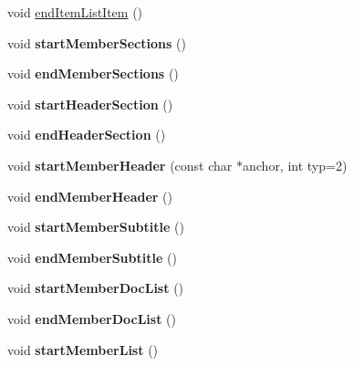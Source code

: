 \begin{DoxyCompactItemize}
\item 
void \mbox{\hyperlink{class_output_list_a784d921c1961db570e1b12905fe97c05}{end\+Item\+List\+Item}} ()
\item 
\mbox{\label{class_output_list_a6f8bf0192c18e0ea785c412b23f6fd3f}} 
void {\bfseries start\+Member\+Sections} ()
\item 
\mbox{\label{class_output_list_aff8a0fa5afe518609c8e95ae05a57ee6}} 
void {\bfseries end\+Member\+Sections} ()
\item 
\mbox{\label{class_output_list_a545dcbbbcdf8aac24e32df2abe0ea22d}} 
void {\bfseries start\+Header\+Section} ()
\item 
\mbox{\label{class_output_list_a327fd876b42a81d55c668042dc3104d7}} 
void {\bfseries end\+Header\+Section} ()
\item 
\mbox{\label{class_output_list_a9f5502582b1bf4ccf75108be20d78545}} 
void {\bfseries start\+Member\+Header} (const char $\ast$anchor, int typ=2)
\item 
\mbox{\label{class_output_list_ad50904387e56ccb6532385bfe525e9a2}} 
void {\bfseries end\+Member\+Header} ()
\item 
\mbox{\label{class_output_list_add8c37a5cb21fb366c941cea862b2285}} 
void {\bfseries start\+Member\+Subtitle} ()
\item 
\mbox{\label{class_output_list_ad7bb1f47d3fe0d2bc473093e405f348e}} 
void {\bfseries end\+Member\+Subtitle} ()
\item 
\mbox{\label{class_output_list_ada069f601f0651010bc78b3ccb0f6f11}} 
void {\bfseries start\+Member\+Doc\+List} ()
\item 
\mbox{\label{class_output_list_a65672c5fa7d9f56208917e3d4b8e1895}} 
void {\bfseries end\+Member\+Doc\+List} ()
\item 
\mbox{\label{class_output_list_a7431bc4b23642f75af48f25a415d4ec8}} 
void {\bfseries start\+Member\+List} ()

\end{DoxyCompactItemize}
